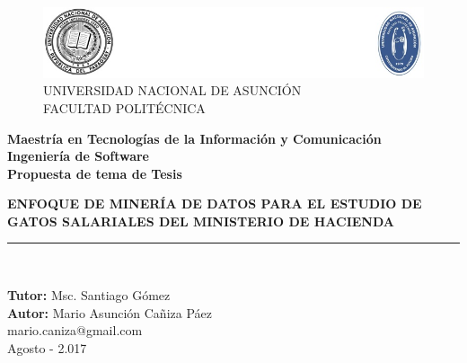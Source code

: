 \begin{titlepage}
		\begin{center}
			\vspace*{0.8in}
			\begin{figure}
				\centering
				\includegraphics[width=0.9\linewidth]{graficos/unalogos.jpg}
				UNIVERSIDAD NACIONAL DE ASUNCIÓN\\
				\vspace*{0.15in}
				FACULTAD POLITÉCNICA\\
			\end{figure}
			\begin{large}
				\textbf{Maestría en Tecnologías de la Información y Comunicación}\\
				\vspace*{0.3in}
				\textbf{Ingeniería de Software}\\
				\textbf{Propuesta de tema de Tesis}\\
			\end{large}
			\vspace*{0.6in}
			\begin{Large}
				\textbf{ENFOQUE DE MINERÍA DE DATOS PARA EL ESTUDIO DE GATOS SALARIALES DEL MINISTERIO DE HACIENDA} \\
			\end{Large}
			\vspace*{0.3in}
			\rule{80mm}{0.1mm}\\
			\vspace*{0.4in}
			\begin{large}
				\textbf{Tutor:} Msc. Santiago Gómez\\
				\vspace*{0.3in}
				\textbf{Autor:} Mario Asunción Cañiza  Páez\\mario.caniza@gmail.com\\
				\vspace*{0.6in}
				Agosto - 2.017
				\vspace*{0.20in}
			\end{large}
		\end{center}
	\end{titlepage}
